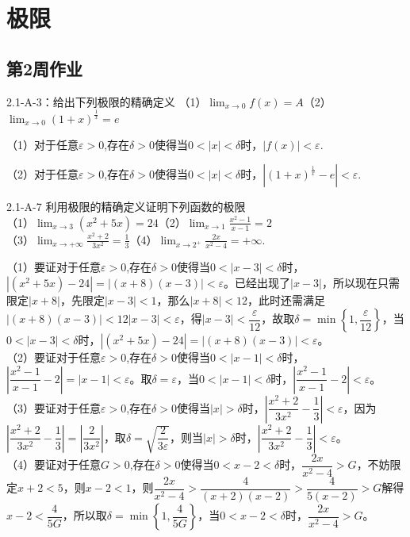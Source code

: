 \chapter{极限}
\newpage
\section{第2周作业}
\begin{example}{2.1-A-3：给出下列极限的精确定义}{}
    （1）$\displaystyle\lim_{x\to 0}f(x)=A$\quad （2）$\displaystyle\lim_{x\to 0}(1+x)^{\frac{1}{x}}=e$
\end{example}
\begin{solution}
    （1）对于任意$\varepsilon >0$,存在$\delta>0$使得当$0<|x|<\delta$时，$|f(x)|<\varepsilon$.

    （2）对于任意$\varepsilon>0$,存在$\delta>0$使得当$0<|x|<\delta$时，$|(1+x)^{\frac{1}{x}}-e|<\varepsilon$.
\end{solution}
\begin{example}{2.1-A-7}{}
    利用极限的精确定义证明下列函数的极限\\
    \noindent（1）$\displaystyle\lim_{x\to 3}(x^2+5x)=24$\quad （2）$\displaystyle\lim_{x\to 1}\frac{x^2-1}{x-1}=2$\\
    （3）$\displaystyle\lim_{x\to +\infty}\frac{x^2+2}{3x^2}=\frac13$\quad（4）$\displaystyle\lim_{x\to 2^{+}}\frac{2x}{x^2-4}=+\infty$.
\end{example}
\begin{solution}
    （1）要证对于任意$\varepsilon>0$,存在$\delta>0$使得当$0<|x-3|<\delta$时，$|(x^2+5x)-24|=|(x+8)(x-3)|<\varepsilon$。已经出现了$|x-3|$，所以现在只需限定$|x+8|$，先限定$|x-3|<1$，那么$|x+8|<12$，此时还需满足$|(x+8)(x-3)|<12|x-3|<\varepsilon$，得$|x-3|<\dfrac{\varepsilon}{12}$，故取$\delta=\min\left\{1,\dfrac{\varepsilon}{12}\right\}$，当$0<|x-3|<\delta$时，$|(x^2+5x)-24|=|(x+8)(x-3)|<\varepsilon$。\\
    （2）要证对于任意$\varepsilon>0$,存在$\delta>0$使得当$0<|x-1|<\delta$时，$\left|\dfrac{x^2-1}{x-1}-2\right|=|x-1|<\varepsilon$。取$\delta=\varepsilon$，当$0<|x-1|<\delta$时，$\left|\dfrac{x^2-1}{x-1}-2\right|<\varepsilon$。\\
    （3）要证对于任意$\varepsilon>0$,存在$\delta>0$使得当$|x|>\delta$时，$\left|\dfrac{x^2+2}{3x^2}-\dfrac{1}{3}\right|<\varepsilon$，因为$\left|\dfrac{x^2+2}{3x^2}-\dfrac{1}{3}\right|=\left|\dfrac{2}{3x^2}\right|$，取$\delta=\sqrt{\dfrac{2}{3\varepsilon}}$，则当$|x|>\delta$时，$\left|\dfrac{x^2+2}{3x^2}-\dfrac{1}{3}\right|<\varepsilon$。\\
    （4）要证对于任意$G>0$,存在$\delta>0$使得当$0<x-2<\delta$时，$\dfrac{2x}{x^2-4}>G$，不妨限定$x+2<5$，则$x-2<1$，则$\dfrac{2x}{x^2-4}>\dfrac{4}{(x+2)(x-2)}>\dfrac{4}{5(x-2)}>G$解得$x-2<\dfrac{4}{5G}$，所以取$\delta=\min\left\{1,\dfrac{4}{5G}\right\}$，当$0<x-2<\delta$时，$\dfrac{2x}{x^2-4}>G$。
\end{solution}
